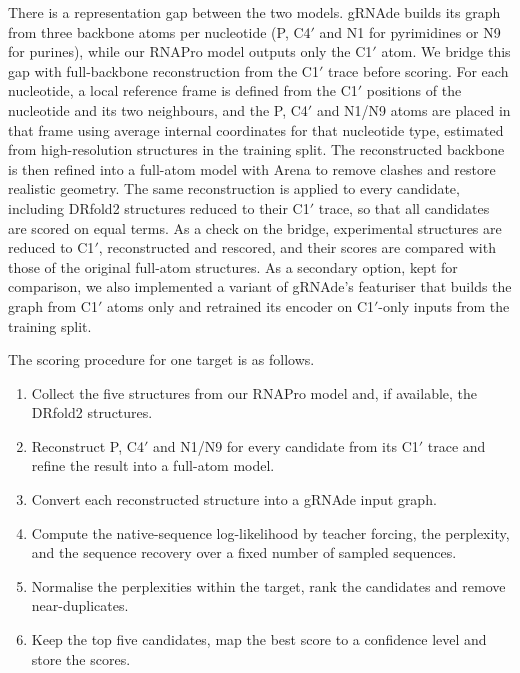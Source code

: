 \documentclass{FastFyp}
\begin{document}
There is a representation gap between the two models. gRNAde builds its graph from three backbone atoms per nucleotide (P, C4$'$ and N1 for pyrimidines or N9 for purines), while our RNAPro model outputs only the C1$'$ atom. We bridge this gap with full-backbone reconstruction from the C1$'$ trace before scoring. For each nucleotide, a local reference frame is defined from the C1$'$ positions of the nucleotide and its two neighbours, and the P, C4$'$ and N1/N9 atoms are placed in that frame using average internal coordinates for that nucleotide type, estimated from high-resolution structures in the training split. The reconstructed backbone is then refined into a full-atom model with Arena to remove clashes and restore realistic geometry. The same reconstruction is applied to every candidate, including DRfold2 structures reduced to their C1$'$ trace, so that all candidates are scored on equal terms. As a check on the bridge, experimental structures are reduced to C1$'$, reconstructed and rescored, and their scores are compared with those of the original full-atom structures. As a secondary option, kept for comparison, we also implemented a variant of gRNAde's featuriser that builds the graph from C1$'$ atoms only and retrained its encoder on C1$'$-only inputs from the training split.

The scoring procedure for one target is as follows.

\begin{enumerate}
\item Collect the five structures from our RNAPro model and, if available, the DRfold2 structures.
\item Reconstruct P, C4$'$ and N1/N9 for every candidate from its C1$'$ trace and refine the result into a full-atom model.
\item Convert each reconstructed structure into a gRNAde input graph.
\item Compute the native-sequence log-likelihood by teacher forcing, the perplexity, and the sequence recovery over a fixed number of sampled sequences.
\item Normalise the perplexities within the target, rank the candidates and remove near-duplicates.
\item Keep the top five candidates, map the best score to a confidence level and store the scores.
\end{enumerate}
\end{document}
